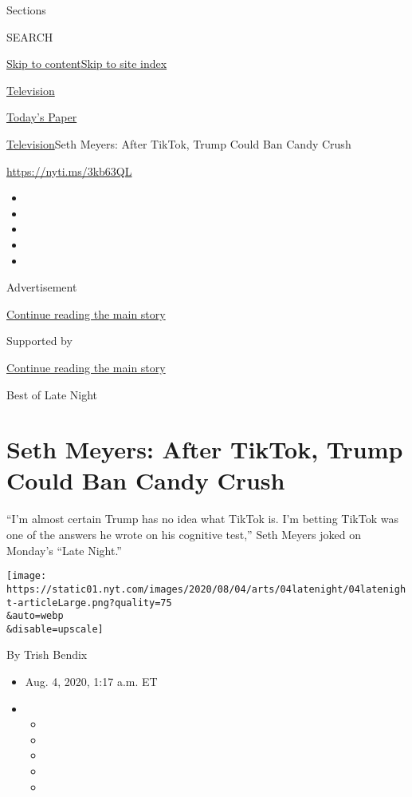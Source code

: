 Sections

SEARCH

\protect\hyperlink{site-content}{Skip to
content}\protect\hyperlink{site-index}{Skip to site index}

\href{https://www.nytimes.com/section/arts/television}{Television}

\href{https://myaccount.nytimes.com/auth/login?response_type=cookie\&client_id=vi}{}

\href{https://www.nytimes.com/section/todayspaper}{Today's Paper}

\href{/section/arts/television}{Television}\textbar{}Seth Meyers: After
TikTok, Trump Could Ban Candy Crush

\url{https://nyti.ms/3kb63QL}

\begin{itemize}
\item
\item
\item
\item
\item
\end{itemize}

Advertisement

\protect\hyperlink{after-top}{Continue reading the main story}

Supported by

\protect\hyperlink{after-sponsor}{Continue reading the main story}

Best of Late Night

\hypertarget{seth-meyers-after-tiktok-trump-could-ban-candy-crush}{%
\section{Seth Meyers: After TikTok, Trump Could Ban Candy
Crush}\label{seth-meyers-after-tiktok-trump-could-ban-candy-crush}}

``I'm almost certain Trump has no idea what TikTok is. I'm betting
TikTok was one of the answers he wrote on his cognitive test,'' Seth
Meyers joked on Monday's ``Late Night.''

\texttt{[image: https://static01.nyt.com/images/2020/08/04/arts/04latenight/04latenight-articleLarge.png?quality=75\\\&auto=webp\\\&disable=upscale]}

By Trish Bendix

\begin{itemize}
\item
  Aug. 4, 2020, 1:17 a.m. ET
\item
  \begin{itemize}
  \item
  \item
  \item
  \item
  \item
  \end{itemize}
\end{itemize}

